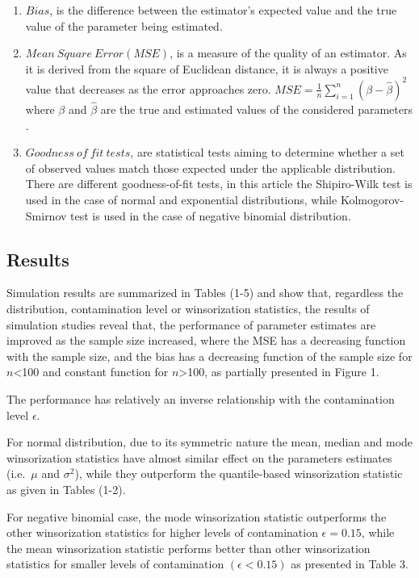 \documentclass[
]{article}
\begin{document}
\begin{enumerate}
\def\labelenumi{\arabic{enumi}.}
\item
  \(Bias\), is the difference between the estimator's expected value and
  the true value of the parameter being estimated.
\item
  \(Mean \ Square\ Error (MSE)\), is a measure of the quality of an
  estimator. As it is derived from the square of Euclidean distance, it
  is always a positive value that decreases as the error approaches
  zero. \(MSE = \frac{1}{n} \sum_{i=1}^n (\beta - \hat{\beta})^2\) where
  \(\beta\) and \(\hat{\beta}\) are the true and estimated values of the
  considered parameters .
\item
  \(Goodness\ of\ fit\ tests\), are statistical tests aiming to
  determine whether a set of observed values match those expected under
  the applicable distribution. There are different goodness-of-fit
  tests, in this article the Shipiro-Wilk test is used in the case of
  normal and exponential distributions, while Kolmogorov-Smirnov test is
  used in the case of negative binomial distribution.
\end{enumerate}

\hypertarget{results}{%
\subsection{Results}\label{results}}

Simulation results are summarized in Tables (1-5) and show that,
regardless the distribution, contamination level or winsorization
statistics, the results of simulation studies reveal that, the
performance of parameter estimates are improved as the sample size
increased, where the MSE has a decreasing function with the sample size,
and the bias has a decreasing function of the sample size for
\(n\)\textless100 and constant function for \(n\)\textgreater100, as
partially presented in Figure 1.

The performance has relatively an inverse relationship with the
contamination level \(\epsilon\).

For normal distribution, due to its symmetric nature the mean, median
and mode winsorization statistics have almost similar effect on the
parameters estimates (i.e.~\(\mu\) and \(\sigma^2\)), while they
outperform the quantile-based winsorization statistic as given in Tables
(1-2).

For negative binomial case, the mode winsorization statistic outperforms
the other winsorization statistics for higher levels of contamination
\(\epsilon=0.15\), while the mean winsorization statistic performs
better than other winsorization statistics for smaller levels of
contamination \((\epsilon<0.15)\) as presented in Table 3.
\end{document}

